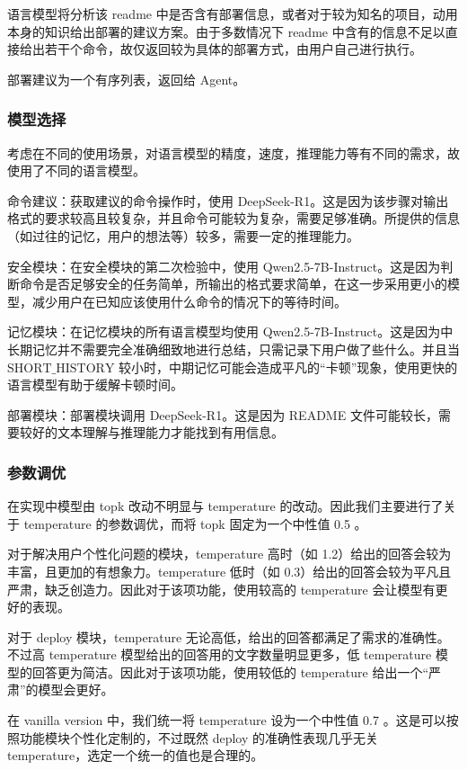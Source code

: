 \documentclass{article}
\theoremstyle{plain}
\theoremstyle{definition}
\theoremstyle{remark}
\begin{document}
语言模型将分析该 readme 中是否含有部署信息，或者对于较为知名的项目，动用本身的知识给出部署的建议方案。由于多数情况下 readme 中含有的信息不足以直接给出若干个命令，故仅返回较为具体的部署方式，由用户自己进行执行。

部署建议为一个有序列表，返回给 Agent。

\subsubsection{模型选择}

考虑在不同的使用场景，对语言模型的精度，速度，推理能力等有不同的需求，故使用了不同的语言模型。

命令建议：获取建议的命令操作时，使用 DeepSeek-R1。这是因为该步骤对输出格式的要求较高且较复杂，并且命令可能较为复杂，需要足够准确。所提供的信息（如过往的记忆，用户的想法等）较多，需要一定的推理能力。

安全模块：在安全模块的第二次检验中，使用 Qwen2.5-7B-Instruct。这是因为判断命令是否足够安全的任务简单，所输出的格式要求简单，在这一步采用更小的模型，减少用户在已知应该使用什么命令的情况下的等待时间。

记忆模块：在记忆模块的所有语言模型均使用 Qwen2.5-7B-Instruct。这是因为中长期记忆并不需要完全准确细致地进行总结，只需记录下用户做了些什么。并且当 $\text{SHORT\_HISTORY}$ 较小时，中期记忆可能会造成平凡的“卡顿”现象，使用更快的语言模型有助于缓解卡顿时间。

部署模块：部署模块调用 DeepSeek-R1。这是因为 README 文件可能较长，需要较好的文本理解与推理能力才能找到有用信息。

\subsubsection{参数调优}

在实现中模型由 topk 改动不明显与 temperature 的改动。因此我们主要进行了关于 temperature 的参数调优，而将 topk 固定为一个中性值 0.5 。

对于解决用户个性化问题的模块，temperature 高时（如 1.2）给出的回答会较为丰富，且更加的有想象力。temperature 低时（如 0.3）给出的回答会较为平凡且严肃，缺乏创造力。因此对于该项功能，使用较高的 temperature 会让模型有更好的表现。

对于 deploy 模块，temperature 无论高低，给出的回答都满足了需求的准确性。不过高 temperature 模型给出的回答用的文字数量明显更多，低 temperature 模型的回答更为简洁。因此对于该项功能，使用较低的 temperature 给出一个“严肃”的模型会更好。

在 vanilla version 中，我们统一将 temperature 设为一个中性值 0.7 。这是可以按照功能模块个性化定制的，不过既然 deploy 的准确性表现几乎无关 temperature，选定一个统一的值也是合理的。
\end{document}
